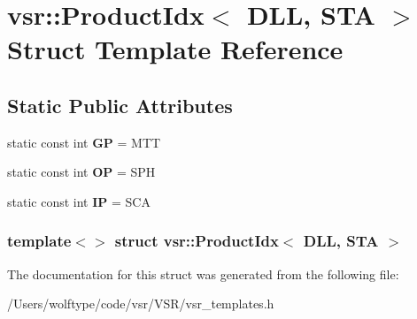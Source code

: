\hypertarget{structvsr_1_1_product_idx_3_01_d_l_l_00_01_s_t_a_01_4}{\section{vsr\-:\-:Product\-Idx$<$ D\-L\-L, S\-T\-A $>$ Struct Template Reference}
\label{structvsr_1_1_product_idx_3_01_d_l_l_00_01_s_t_a_01_4}
}
\subsection*{Static Public Attributes}
\begin{DoxyCompactItemize}
\item 
\hypertarget{structvsr_1_1_product_idx_3_01_d_l_l_00_01_s_t_a_01_4_ae0e046db3aa05600d7d6d87db7e65980}{static const int {\bfseries G\-P} = M\-T\-T}\label{structvsr_1_1_product_idx_3_01_d_l_l_00_01_s_t_a_01_4_ae0e046db3aa05600d7d6d87db7e65980}

\item 
\hypertarget{structvsr_1_1_product_idx_3_01_d_l_l_00_01_s_t_a_01_4_a1e606c816251579d9adb8280e74b58ed}{static const int {\bfseries O\-P} = S\-P\-H}\label{structvsr_1_1_product_idx_3_01_d_l_l_00_01_s_t_a_01_4_a1e606c816251579d9adb8280e74b58ed}

\item 
\hypertarget{structvsr_1_1_product_idx_3_01_d_l_l_00_01_s_t_a_01_4_a6209d6f00ddab1e1c656d1677c78b258}{static const int {\bfseries I\-P} = S\-C\-A}\label{structvsr_1_1_product_idx_3_01_d_l_l_00_01_s_t_a_01_4_a6209d6f00ddab1e1c656d1677c78b258}

\end{DoxyCompactItemize}
\subsubsection*{template$<$$>$ struct vsr\-::\-Product\-Idx$<$ D\-L\-L, S\-T\-A $>$}



The documentation for this struct was generated from the following file\-:\begin{DoxyCompactItemize}
\item 
/\-Users/wolftype/code/vsr/\-V\-S\-R/vsr\-\_\-templates.\-h\end{DoxyCompactItemize}
